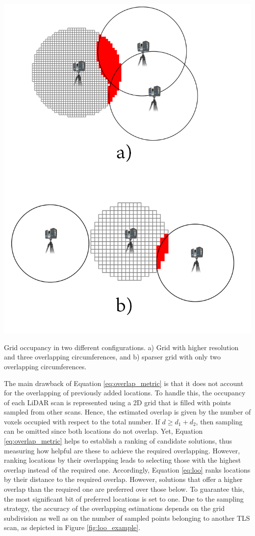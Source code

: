 \begin{marginfigure}
    \centering
    \includegraphics[width=.8\linewidth]{figs/lidar_optimization/loo.png}
	\caption{Grid occupancy in two different configurations. a) Grid with higher resolution and three overlapping circumferences, and b) sparser grid with only two overlapping circumferences.}
	\label{fig:loo_example}
\end{marginfigure}
The main drawback of Equation \ref{eq:overlap_metric} is that it does not account for the overlapping of previously added locations. To handle this, the occupancy of each LiDAR scan is represented using a 2D grid that is filled with points sampled from other scans. Hence, the estimated overlap is given by the number of voxels occupied with respect to the total number. If $d \geq d_1 + d_2$, then sampling can be omitted since both locations do not overlap. Yet, Equation \ref{eq:overlap_metric} helps to establish a ranking of candidate solutions, thus measuring how helpful are these to achieve the required overlapping. However, ranking locations by their overlapping leads to selecting those with the highest overlap instead of the required one. Accordingly, Equation \ref{eq:loo} ranks locations by their distance to the required overlap. However, solutions that offer a higher overlap than the required one are preferred over those below. To guarantee this, the most significant bit of preferred locations is set to one. Due to the sampling strategy, the accuracy of the overlapping estimations depends on the grid subdivision as well as on the number of sampled points belonging to another TLS scan, as depicted in Figure \ref{fig:loo_example}.
